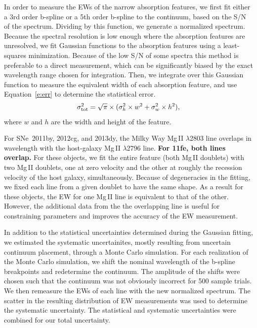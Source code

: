 \documentclass[useAMS,usenatbib]{mn2e}
\newcommand\ion[2]{#1$\,${\small{#2}}\relax}
\begin{document}
In order to measure the EWs of the narrow absorption features, we first fit either a 3rd order b-spline or a 5th order b-spline to the continuum, based on the S/N of the spectrum.  Dividing by this function, we generate a normalized spectrum.  Because the spectral resolution is low enough where the absorption features are unresolved, we fit Gaussian functions to the absorption features using a least-squares minimization.  Because of the low S/N of some spectra this method is preferable to a direct measurement, which can be significantly biased by the exact wavelength range chosen for integration. Then, we integrate over this Gaussian function to measure the equivalent width of each absorption feature, and use Equation~\ref{e:err} to determine the statistical error.
\begin{equation}
  \sigma_{\rm tot}^{2} = \sqrt{\pi} \times (\sigma_{h}^{2} \times w^{2} + \sigma_{w}^{2} \times h^{2}),
\end{equation}\label{e:err}
where $w$ and $h$ are the width and height of the feature.

For SNe~2011by, 2012cg, and 2013dy, the Milky Way \ion{Mg}{II} $\lambda$2803 line overlaps in wavelength with the host-galaxy \ion{Mg}{II} $\lambda$2796 line.  {\bf For 11fe, both lines overlap.}  For these objects, we fit the entire feature (both \ion{Mg}{II} doublets) with two \ion{Mg}{II} doublets, one at zero velocity and the other at roughly the recession velocity of the host galaxy, simultaneously.  Because of degeneracies in the fitting, we fixed each line from a given doublet to have the same shape.  As a result for these objects, the EW for one \ion{Mg}{II} line is equivalent to that of the other.  However, the additional data from the the overlapping line is useful for constraining parameters and improves the accuracy of the EW measurement.

In addition to the statistical uncertainties determined during the Gaussian fitting, we estimated the systematic uncertainites, mostly resulting from uncertain continuum placement, through a Monte Carlo simulation.  For each realization of the Monte Carlo simulation, we shift the nominal wavelength of the b-spline breakpoints and redetermine the continuum.  The amplitude of the shifts were chosen such that the continuum was not obviously incorrect for 500 sample trials.  We then remeasure the EWs of each line with the new normalized spectrum.  The scatter in the resulting distribution of EW measurements was used to determine the systematic uncertainty.  The statistical and systematic uncertainties were combined for our total uncertainty.
\end{document}
